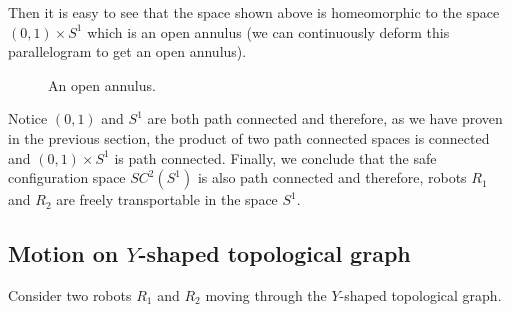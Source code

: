 \documentclass[12pt]{article}
\theoremstyle{definition}
\begin{document}
Then it is easy to see that the space shown above is homeomorphic to the space
$(0, 1) \times S^1$ which is an open annulus (we can continuously deform this parallelogram
to get an open annulus).

\begin{figure}[H]
    \centering
    \caption*{An open annulus.}
\end{figure}

Notice $(0, 1)$ and $S^1$ are both path connected and therefore,
as we have proven in the previous section, the product of two path connected spaces is
connected and $(0, 1) \times S^1$ is path connected. Finally, we conclude that the safe
configuration space $SC^2(S^1)$ is also path connected and therefore, robots $R_1$ and
$R_2$ are freely transportable in the space $S^1$.


\subsection*{\centering Motion on $Y$-shaped topological graph}

Consider two robots $R_1$ and $R_2$ moving through the $Y$-shaped topological graph.

\end{document}
